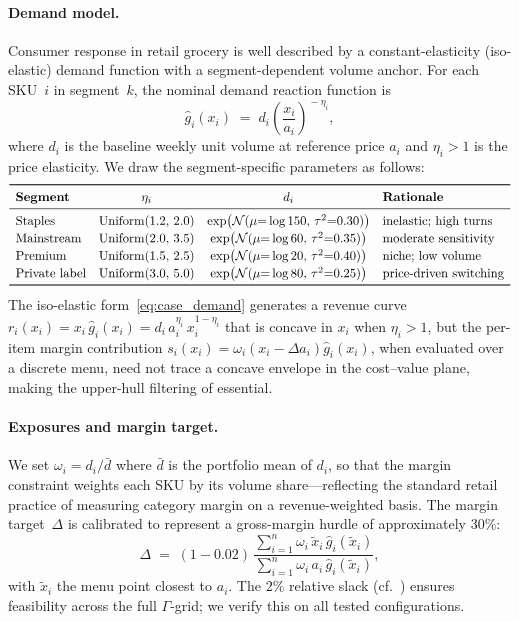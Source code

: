 \documentclass[11pt, a4paper]{article}
\theoremstyle{plain}
\theoremstyle{definition}
\theoremstyle{remark}
\begin{document}
\paragraph{Demand model.}
Consumer response in retail grocery is well described by a constant-elasticity (iso-elastic)
demand function with a segment-dependent volume anchor.
For each SKU~$i$ in segment~$k$, the nominal demand reaction function is
\begin{equation}\label{eq:case_demand}
  \hat g_i(x_i)
  \;=\; d_i\!\left(\frac{x_i}{a_i}\right)^{\!-\eta_i},
\end{equation}
where $d_i$ is the baseline weekly unit volume at reference price $a_i$ and $\eta_i>1$ is the
price elasticity. We draw the segment-specific parameters as follows:
\[
\renewcommand{\arraystretch}{1.15}
\begin{array}{lccl}
\toprule
\textbf{Segment} & \eta_i & d_i & \textbf{Rationale}\\
\midrule
\text{Staples}
  & \mathrm{Uniform}(1.2,\,2.0)
  & \exp\bigl(\mathcal N(\mu{=}\log 150,\,\tau^2{=}0.30)\bigr)
  & \text{inelastic; high turns}\\
\text{Mainstream}
  & \mathrm{Uniform}(2.0,\,3.5)
  & \exp\bigl(\mathcal N(\mu{=}\log 60,\,\tau^2{=}0.35)\bigr)
  & \text{moderate sensitivity}\\
\text{Premium}
  & \mathrm{Uniform}(1.5,\,2.5)
  & \exp\bigl(\mathcal N(\mu{=}\log 20,\,\tau^2{=}0.40)\bigr)
  & \text{niche; low volume}\\
\text{Private label}
  & \mathrm{Uniform}(3.0,\,5.0)
  & \exp\bigl(\mathcal N(\mu{=}\log 80,\,\tau^2{=}0.25)\bigr)
  & \text{price-driven switching}\\
\bottomrule
\end{array}
\]
The iso-elastic form~\eqref{eq:case_demand} generates a revenue curve
$r_i(x_i) = x_i\,\hat g_i(x_i) = d_i\,a_i^{\eta_i}\,x_i^{1-\eta_i}$ that is concave in $x_i$
when $\eta_i>1$, but the per-item margin contribution
$s_i(x_i) = \omega_i(x_i - \Delta a_i)\hat g_i(x_i)$, when evaluated over a discrete menu,
need not trace a concave envelope in the cost--value plane, making the upper-hull filtering
of  essential.

\paragraph{Exposures and margin target.}
We set $\omega_i = d_i / \bar d$ where $\bar d$ is the portfolio mean of $d_i$, so that the
margin constraint weights each SKU by its volume share---reflecting the standard retail
practice of measuring category margin on a revenue-weighted basis.
The margin target~$\Delta$ is calibrated to represent a gross-margin hurdle of approximately
$30\%$:
\[
\Delta \;=\; (1 - 0.02)\,
\frac{\sum_{i=1}^n \omega_i\,\tilde x_i\,\hat g_i(\tilde x_i)}%
     {\sum_{i=1}^n \omega_i\,a_i\,\hat g_i(\tilde x_i)},
\]
with $\tilde x_i$ the menu point closest to $a_i$. The $2\%$ relative slack
(cf.\ ) ensures feasibility across the full $\Gamma$-grid;
we verify this on all tested configurations.
\end{document}
